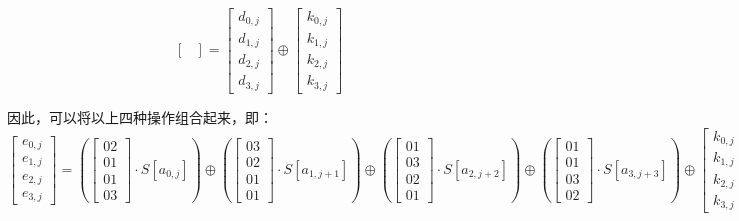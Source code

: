 \documentclass[11pt]{ctexart}
\begin{document}
\begin{enumerate}[(1)]
\begin{equation*}
\begin{bmatrix}
    \end{bmatrix}
    =
    \begin{bmatrix}
    d_{0, j} \\ d_{1, j} \\ d_{2, j} \\ d_{3, j}
    \end{bmatrix}
    \oplus
    \begin{bmatrix}
    k_{0, j} \\ k_{1, j} \\ k_{2, j} \\ k_{3, j}
    \end{bmatrix}
    \end{equation*}
\end{enumerate}
因此，可以将以上四种操作组合起来，即：
\begin{equation*}
    \begin{bmatrix}
    e_{0, j} \\ e_{1, j} \\ e_{2, j} \\ e_{3, j}
    \end{bmatrix}
    =
    \left(
    \begin{bmatrix}
    02 \\ 01 \\ 01 \\ 03
    \end{bmatrix}
    \cdot S[a_{0, j}] \right)
    \oplus
    \left(
    \begin{bmatrix}
    03 \\ 02 \\ 01 \\ 01
    \end{bmatrix}
    \cdot S[a_{1, j+1}] \right)
    \oplus
    \left(
    \begin{bmatrix}
    01 \\ 03 \\ 02 \\ 01
    \end{bmatrix}
    \cdot S[a_{2, j+2}] \right)
    \oplus
    \left(
    \begin{bmatrix}
    01 \\ 01 \\ 03 \\ 02
    \end{bmatrix}
    \cdot S[a_{3, j+3}] \right)
    \oplus
    \begin{bmatrix}
    k_{0, j} \\ k_{1, j} \\ k_{2, j} \\ k_{3, j}
    \end{bmatrix}
\end{equation*}
\end{document}
